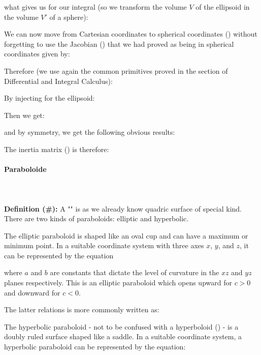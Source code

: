 {	what gives us for our integral (so we transform the volume $V$ of the ellipsoid in the volume $V'$ of a sphere):
	
	We can now move from Cartesian coordinates to spherical coordinates () without forgetting to use the Jacobian () that we had proved as being in spherical coordinates given by:
	
	Therefore (we use again the common primitives proved in the section of Differential and Integral Calculus):
	
	By injecting for the ellipsoid:
	
	Then we get:
	
	and by symmetry, we get the following obvious results:
	
	The inertia matrix () is therefore:
	
	
	\paragraph{Paraboloide}\label{paraboloid}\mbox{}\\\\
	\textbf{Definition (\#\mydef):} A "" is as we already know quadric surface of special kind. There are two kinds of paraboloids: elliptic and hyperbolic.
	
	The elliptic paraboloid is shaped like an oval cup and can have a maximum or minimum point. In a suitable coordinate system with three axes $x$, $y$, and $z$, it can be represented by the equation
	
	where $a$ and $b$ are constants that dictate the level of curvature in the $xz$ and $yz$ planes respectively. This is an elliptic paraboloid which opens upward for $c > 0$ and downward for $c < 0$.
	
	The latter relations is more commonly written as:
	
	
	The hyperbolic paraboloid - not to be confused with a hyperboloid () - is a doubly ruled surface shaped like a saddle. In a suitable coordinate system, a hyperbolic paraboloid can be represented by the equation:
	
}
